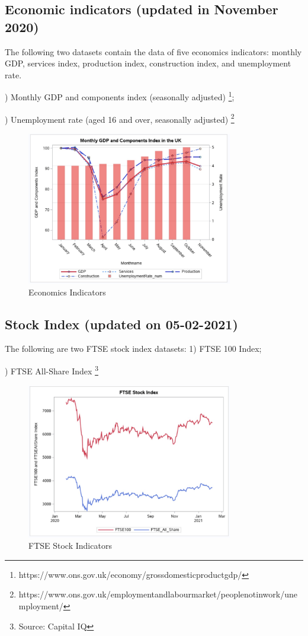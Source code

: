 \documentclass[12pt, a4paper]{report}
\begin{document}
\subsection{Economic indicators (updated in November 2020)} 
The following two datasets contain the data of five economics indicators: monthly GDP, services index, 
production index, construction index, and unemployment rate.\par
{}) Monthly GDP and components index (seasonally adjusted)
\footnote[4]{https://www.ons.gov.uk/economy/grossdomesticproductgdp/};\par
{}) Unemployment rate (aged 16 and over, seasonally adjusted)
\footnote[5]{https://www.ons.gov.uk/employmentandlabourmarket/peoplenotinwork/unemployment/}
\begin{figure}[H] 
\centering 
\includegraphics[width=9cm]{economics.jpg} 
\caption{Economics Indicators}
\end{figure}
    
\subsection{Stock Index (updated on 05-02-2021)}
The following are two FTSE stock index datasets:
1) FTSE 100 Index;\par
{}) FTSE All-Share Index
\footnote[6]{Source: Capital IQ}
\begin{figure}[H] 
\centering 
\includegraphics[width=9cm]{ftse.jpg} 
\caption{FTSE Stock Indicators}
\end{figure}
        
\end{document}

